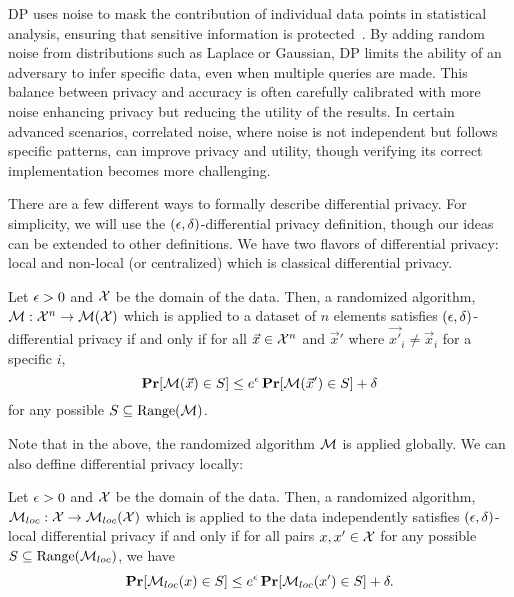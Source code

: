 \documentclass[11pt]{article}
\begin{document}
DP uses noise to mask the contribution of individual data points in statistical analysis, ensuring that sensitive information is protected~\cite{dwork2006differential}. 
By adding random noise from distributions such as Laplace or Gaussian, DP limits the ability of an adversary to infer specific data, even when multiple queries are made. 
This balance between privacy and accuracy is often carefully calibrated with more noise enhancing privacy but reducing the utility of the results. 
In certain advanced scenarios, correlated noise, where noise is not independent but follows specific patterns, can improve privacy and utility, though verifying its correct implementation becomes more challenging.

There are a few different ways to formally describe differential privacy.
For simplicity, we will use the $(\epsilon, \delta)$-differential privacy definition, though our ideas can be extended to other definitions.
We have two flavors of differential privacy: local and non-local (or centralized) which is classical differential privacy.


\begin{definition}
	Let $\epsilon > 0$ and $\mathcal{X}$ be the domain of the data.
	Then, a randomized algorithm, $\mathcal{M} : \mathcal{X}^n \rightarrow \mathcal{M}(\mathcal{X})$ which is applied to a dataset of $n$ elements satisfies $(\epsilon, \delta)$-differential privacy if and only if for all $\vec{x} \in \mathcal{X}^n$ and $\vec{x}'$ where $\vec{x'}_i \neq \vec{x}_i$ for a specific $i$,
	\[
		\operatorname*{\mathbf{Pr}}[\mathcal{M}(\vec{x}) \in S] \leq e^\epsilon \operatorname*{\mathbf{Pr}}[\mathcal{M}(\vec{x}') \in S] + \delta
	\]
	for any possible $S \subseteq \text{Range}(\mathcal{M})$.
\end{definition}

Note that in the above, the randomized algorithm $\mathcal{M}$ is applied globally.
We can also deffine differential privacy locally:

\begin{definition}
	Let $\epsilon > 0$ and $\mathcal{X}$ be the domain of the data.
	Then, a randomized algorithm, $\mathcal{M}_{loc} : \mathcal{X} \rightarrow \mathcal{M}_{loc}(\mathcal{X})$ which is applied to the data independently satisfies $(\epsilon, \delta)$-local differential privacy if and only if for all pairs $x, x' \in \mathcal{X}$
	for any possible $S \subseteq \text{Range}(\mathcal{M}_{loc})$, we have
	\[
		\operatorname*{\mathbf{Pr}}[\mathcal{M}_{loc}(x) \in S] \leq e^\epsilon \operatorname*{\mathbf{Pr}}[\mathcal{M}_{loc}(x') \in S] + \delta.
	\]
\end{definition}
\end{document}

